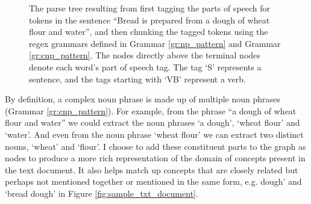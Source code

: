 \documentclass[12pt]{article}
\theoremstyle{grammarstyle}
\begin{document}
\begin{figure}[t]
    \centering
    \caption{The parse tree resulting from first tagging the parts of speech for tokens in the sentence ``Bread is prepared from a dough of wheat flour and water'', and then chunking the tagged tokens using the regex grammars defined in Grammar \ref{gr:np_pattern} and Grammar \ref{gr:cnp_pattern}. The nodes directly above the terminal nodes denote each word's part of speech tag. The tag `S' represents a sentence, and the tags starting with `VB' represent a verb.}
    \label{fig:parse_tree_example}
\end{figure}

By definition, a complex noun phrase is made up of multiple noun phrases (Grammar \ref{gr:cnp_pattern}). For example, from the phrase ``a dough of wheat flour and water'' we could extract the noun phrases `a dough', `wheat flour' and `water'. And even from the noun phrase `wheat flour' we can extract two distinct nouns, `wheat' and `flour'. I choose to add these constituent parts to the graph as nodes to produce a more rich representation of the domain of concepts present in the text document. It also helps match up concepts that are closely related but perhaps not mentioned together or mentioned in the same form, e.g. dough' and `bread dough' in Figure \ref{fig:sample_txt_document}.
\end{document}
